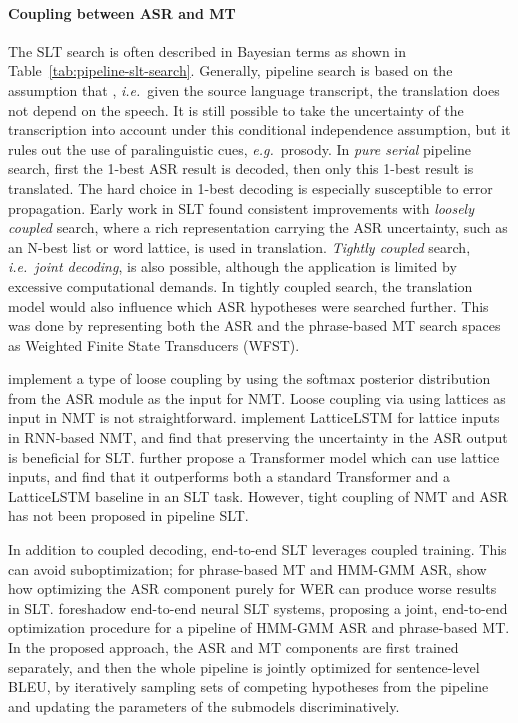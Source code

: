 \documentclass{svjour3}
\newcommand{\ie}[1]{\textit{i.e.}~#1}
\newcommand{\eg}[1]{\textit{e.g.}~#1}
\begin{document}
\paragraph{\textbf{Coupling between ASR and MT}}

The SLT search is often described in Bayesian terms as shown in Table~\ref{tab:pipeline-slt-search}. Generally, pipeline search is based on the assumption that , \ie given the source language transcript, the translation does not depend on the speech. It is still possible to take the uncertainty of the transcription into account under this conditional independence assumption, but it rules out the use of paralinguistic cues, \eg prosody.
In \emph{pure serial} pipeline search, first the 1-best ASR result is decoded, then only this 1-best result is translated. The hard choice in 1-best decoding is especially susceptible to error propagation. Early work in SLT found consistent improvements with \emph{loosely coupled} search, where a rich representation carrying the ASR uncertainty, such as an N-best list or word lattice, is used in translation. \emph{Tightly coupled} search, \ie \emph{joint decoding}, is also possible, although the application is limited by excessive computational demands. In tightly coupled search, the translation model would also influence which ASR hypotheses were searched further. This was done by representing both the ASR and the phrase-based MT search spaces as Weighted Finite State Transducers (WFST).~\citep{matusov2006integrating,zhou2013smt}

\citet{osamura2018using} implement a type of loose coupling by using the softmax posterior distribution from the ASR module as the input for NMT. Loose coupling via using lattices as input in NMT is not straightforward. \citet{sperber-etal-2017-neural} implement LatticeLSTM for lattice inputs in RNN-based NMT, and find that  preserving the uncertainty in the ASR output is beneficial for SLT. \citet{zhang-etal-2019-lattice} further propose a Transformer model which can use lattice inputs, and find that it outperforms both a standard Transformer and a LatticeLSTM baseline in an SLT task. However, tight coupling of NMT and ASR has not been proposed in pipeline SLT.

In addition to coupled decoding, end-to-end SLT leverages coupled training. This can avoid suboptimization; for phrase-based MT and HMM-GMM ASR, \citet{he2011wer} show how optimizing the ASR component purely for WER can produce worse results in SLT. \citet{he2013speech} foreshadow end-to-end neural SLT systems, proposing a joint, end-to-end optimization procedure for a pipeline of HMM-GMM ASR and phrase-based MT. In the proposed approach, the ASR and MT components are first trained separately, and then the whole pipeline is jointly optimized for sentence-level BLEU, by iteratively sampling sets of competing hypotheses from the pipeline and updating the parameters of the submodels discriminatively.
\end{document}
